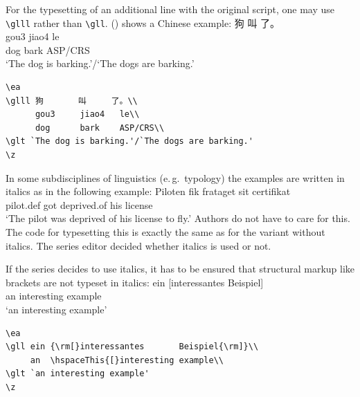For the typesetting of an additional line with the original script, one may use \verb+\glll+ rather
than \verb+\gll+. () shows a Chinese example:
\ea
\label{ex-chinese}
\glll 狗       叫     了。\\
      gou3     jiao4   le\\
      dog      bark    ASP/CRS\\
\glt `The dog is barking.'/`The dogs are barking.'
\z

\begin{verbatim}
\ea
\glll 狗       叫     了。\\
      gou3     jiao4   le\\
      dog      bark    ASP/CRS\\
\glt `The dog is barking.'/`The dogs are barking.'
\z
\end{verbatim}


In some subdisciplines of linguistics (e.\,g.\ typology) the examples are written in italics as in the
following example:
\ea
\def\exfont{\normalsize\it}
\gll Piloten         fik frataget    sit certifikat\footnotemark\\
     pilot.{\sc def} got deprived.of his license\\
\glt `The pilot was deprived of his license to fly.'
\z 
Authors do not have to care for this. The code for typesetting this is exactly the same as for the
variant without italics.
The series editor decided whether italics is used or not.

If the series decides to use italics, it has to be ensured that structural markup like brackets are
not typeset in italics:
\ea
\def\exfont{\normalsize\it}
\gll ein {\rm[}interessantes       Beispiel{\rm]}\\
     an  \hspaceThis{[}interesting example\\
\glt `an interesting example'
\z 
\begin{verbatim}
\ea
\gll ein {\rm[}interessantes       Beispiel{\rm]}\\
     an  \hspaceThis{[}interesting example\\
\glt `an interesting example'
\z 
\end{verbatim}

